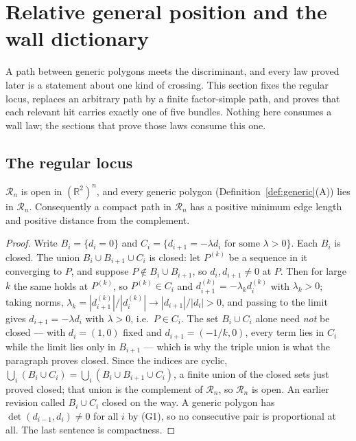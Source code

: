 \section{Relative general position and the wall dictionary}\label{sec:dictionary}

A path between generic polygons meets the discriminant, and every law proved
later is a statement about one kind of crossing. This section fixes the regular
locus, replaces an arbitrary path by a finite factor-simple path, and proves
that each relevant hit carries exactly one of five bundles. Nothing here
consumes a wall law; the sections that prove those laws consume this one.

\subsection{The regular locus}


\begin{lemma}
\label{lem:regularopen}
$\mathcal R_n$ is open in $(\mathbb R^2)^n$, and every generic polygon
(Definition~\ref{def:generic}(A)) lies in $\mathcal R_n$. Consequently a compact
path in $\mathcal R_n$ has a positive minimum edge length and positive distance
from the complement.
\end{lemma}
\begin{proof}
Write $B_i=\{d_i=0\}$ and
$C_i=\{d_{i+1}=-\lambda d_i\text{ for some }\lambda>0\}$. Each $B_i$ is closed.
The union $B_i\cup B_{i+1}\cup C_i$ is closed: let $P^{(k)}$ be a sequence in it
converging to $P$, and suppose $P\notin B_i\cup B_{i+1}$, so $d_i,d_{i+1}\neq0$
at $P$. Then for large $k$ the same holds at $P^{(k)}$, so $P^{(k)}\in C_i$ and
$d_{i+1}^{(k)}=-\lambda_kd_i^{(k)}$ with $\lambda_k>0$; taking norms,
$\lambda_k=|d^{(k)}_{i+1}|/|d^{(k)}_i|\to|d_{i+1}|/|d_i|>0$, and passing to the
limit gives $d_{i+1}=-\lambda d_i$ with $\lambda>0$, i.e.\ $P\in C_i$. The set
$B_i\cup C_i$ alone need \emph{not} be closed --- with $d_i=(1,0)$ fixed and
$d_{i+1}=(-1/k,0)$, every term lies in $C_i$ while the limit lies only in
$B_{i+1}$ --- which is why the triple union is what the paragraph proves
closed. Since the indices are cyclic,
$\bigcup_i(B_i\cup C_i)=\bigcup_i(B_i\cup B_{i+1}\cup C_i)$, a finite union of
the closed sets just proved closed; that union is the complement of
$\mathcal R_n$, so $\mathcal R_n$ is open. An earlier revision called
$B_i\cup C_i$ closed on the way. A generic polygon has
$\det(d_{i-1},d_i)\neq0$ for all $i$ by (G1), so no consecutive pair is
proportional at all. The last sentence is compactness.
\end{proof}




